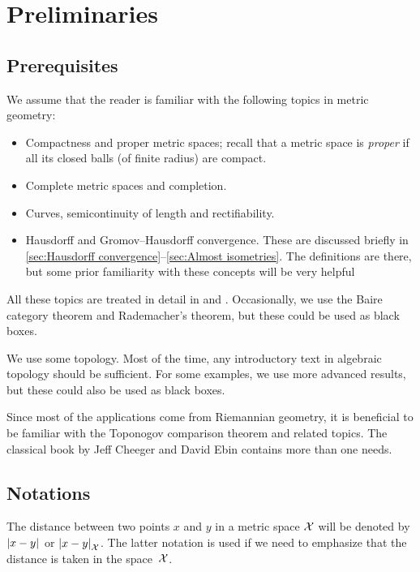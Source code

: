 
\chapter{Preliminaries}\label{chap:prelim}

\section{Prerequisites}

We assume that the reader is familiar with the following topics in metric geometry:
\begin{itemize}
\item Compactness and proper metric spaces;
recall that a metric space is \emph{proper} if all its closed balls (of finite radius) are compact.
\item Complete metric spaces and completion.
\item Curves, semicontinuity of length and rectifiability.
\item Hausdorff and Gromov--Hausdorff convergence.
These are discussed briefly in \ref{sec:Hausdorff convergence}--\ref{sec:Almost isometries}.
The definitions are there, but some prior familiarity with these concepts will be very helpful
\end{itemize}
All these topics are treated in detail in \cite{burago-burago-ivanov} and \cite{petrunin2023pure}.
Occasionally, we use the Baire category theorem and Rademacher's theorem, but these could be used as black boxes.

We use some topology. 
Most of the time, any introductory text in algebraic topology should be sufficient.
For some examples, we use more advanced results, but these could also be used as black boxes.

Since most of the applications come from Riemannian geometry, it is beneficial to be familiar with the Toponogov comparison theorem and related topics.
The classical book by Jeff Cheeger and David Ebin \cite{cheeger-ebin} contains more than one needs.

\section{Notations}

The distance between two points $x$ and $y$ in a metric space $\mathcal{X}$ will be denoted by $|{x}-{y}|_{}^{{}}$ or $|{x}-{y}|_{\mathcal{X}}^{{}}$.\label{page:|x-y|X}
The latter notation is used if we need to emphasize 
that the distance is taken in the space~${\mathcal{X}}$.

